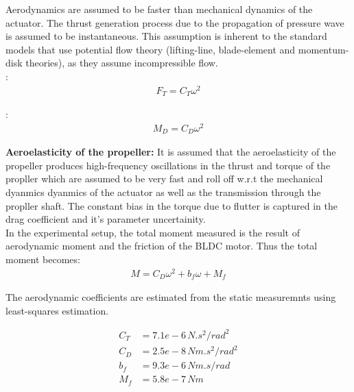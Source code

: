 Aerodynamics are assumed to be faster than mechanical dynamics of the actuator.
The thrust generation process due to the propagation of pressure wave is assumed to be instantaneous. This assumption is inherent to the standard models that use potential flow theory (lifting-line, blade-element and momentum-disk theories), as they assume incompressible flow.\\

:
\begin{align*}
    F_T = C_{T} \omega^2
\end{align*}

:
\begin{align*}
    M_D = C_{D} \omega^2
\end{align*}

\textbf{Aeroelasticity of the propeller:} It is assumed that the aeroelasticity of the propeller produces high-frequency oscillations in the thrust and torque of the propller which are assumed to be very fast and roll off w.r.t the mechanical dyanmics dyanmics of the actuator as well as the transmission through the propller shaft. The constant  bias in the torque due to flutter is captured in the drag coefficient and it's parameter uncertainity.\\

In the experimental setup, the total moment measured is the result of aerodynamic moment and the friction of the BLDC motor. Thus the total moment becomes:
\begin{align*}
    M = C_D \omega^2 + b_f \omega + M_f
\end{align*}

The aerodynamic coefficients are estimated from the static measuremnts using least-squares estimation.

\begin{align*}
    C_T &= 7.1e-6 \, {N.s^2/rad^2}\\
    C_D &= 2.5e-8 \, {Nm.s^2/rad^2}\\
    b_f &= 9.3e-6 \, {Nm.s/rad}\\
    M_f &= 5.8e-7  \, {Nm}
\end{align*}

